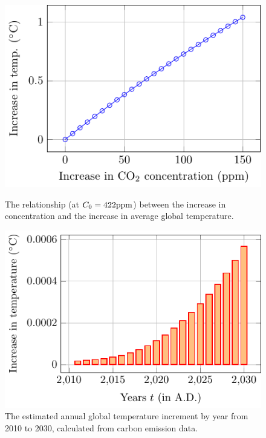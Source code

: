 \documentclass[12pt]{article}
\begin{document}
\begin{figure}[!b]
	\centering
	\begin{minipage}{0.48\textwidth}
		\centering
		\includegraphics{figures/impact/conc_temp.pdf}
		\caption{The relationship (at $C_0 = 422 \rm ppm$) between the increase in  concentration and the increase in average global temperature.}
		\label{fig_co2conc_temp}
	\end{minipage}
	\hfill
	\begin{minipage}{0.48\textwidth}
		\centering
		\includegraphics{figures/impact/temperature.pdf}
		\caption{The estimated annual global temperature increment by year from 2010 to 2030, calculated from carbon emission data.}
		\label{fig_temperature}
	\end{minipage}
\end{figure}
\end{document}
